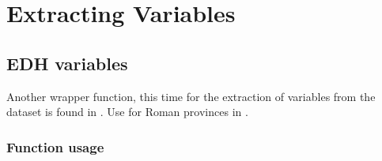 \documentclass[a4paper,12pt,english]{sphinxhowto}
\begin{document}
\section{Extracting  Variables}
\label{\detokenize{EDHVariables:extracting-edh-variables}}\label{\detokenize{EDHVariables:edh-vars}}\label{\detokenize{EDHVariables::doc}}


\subsection{EDH variables}
\label{\detokenize{EDHVariables:edh-variables}}\label{\detokenize{EDHVariables:edhw-fun}}
Another wrapper function, this time for the extraction of variables from the  dataset is found in .
Use  for Roman provinces in .


\begin{fulllineitems}
\label{\detokenize{EDHVariables:edhw}}
\end{fulllineitems}



\subsubsection{Function usage}
\label{\detokenize{EDHVariables:function-usage}}
\begin{sphinxVerbatim}[commandchars=\\\{\},formatcom=\footnotesize]
             
                 
\end{sphinxVerbatim}
\end{document}
